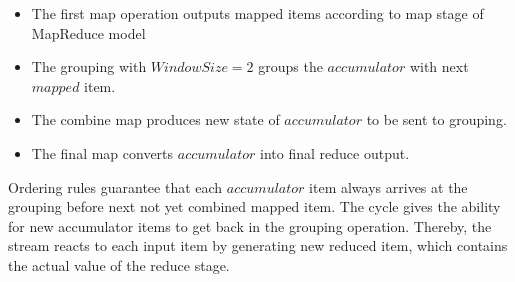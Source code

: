 \begin{itemize}
  \item The first map operation outputs mapped items according to map stage of MapReduce model
  
  \item The grouping with $WindowSize=2$ groups the $accumulator$  with next $mapped$  item. 
  
  \item The combine map  produces new state of $accumulator$ to be sent  to grouping.
  
  \item The final map converts $accumulator$ into final reduce output.
\end{itemize}

Ordering rules  guarantee that each $accumulator$  item always arrives at the grouping  before next not yet combined mapped item.
The cycle gives the ability for new accumulator items to get back in the grouping operation. 
Thereby, the stream reacts to each input item by generating new reduced item, which contains the actual value of the reduce stage.




